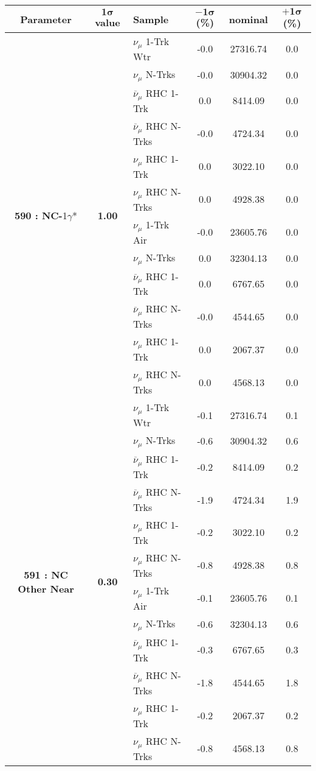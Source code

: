 \begin{table}[ht!]
\centering

\begin{tabular}{ c  c  l  c  c  c }
\midrule[1.3pt]
\textbf{Parameter} & \textbf{$\mathbf{1\sigma}$ value} & \textbf{Sample} & \textbf{$\mathbf{-1\sigma}$ (\%)}  &  \textbf{nominal}  &  \textbf{$\mathbf{+1\sigma}$ (\%)} \\
\midrule[1.3pt]
\multirow{12}{*}{\textbf{590 : NC-}1$\gamma$*}& \multirow{12}{*}{\textbf{1.00}} & $\nu_\mu$ 1-Trk Wtr &   -0.0 &  27316.74 &   0.0 \\ 
 &  & $\nu_\mu$ N-Trks &   -0.0 &  30904.32 &   0.0 \\ 
 &  & $\overline{\nu}_\mu$ RHC 1-Trk &   0.0 &  8414.09 &   0.0 \\ 
 &  & $\overline{\nu}_\mu$ RHC N-Trks &   -0.0 &  4724.34 &   0.0 \\ 
 &  & $\nu_\mu$ RHC 1-Trk &   0.0 &  3022.10 &   0.0 \\ 
 &  & $\nu_\mu$ RHC N-Trks &   0.0 &  4928.38 &   0.0 \\ 
 &  & $\nu_\mu$ 1-Trk Air &   -0.0 &  23605.76 &   0.0 \\ 
 &  & $\nu_\mu$ N-Trks &   0.0 &  32304.13 &   0.0 \\ 
 &  & $\overline{\nu}_\mu$ RHC 1-Trk &   0.0 &  6767.65 &   0.0 \\ 
 &  & $\overline{\nu}_\mu$ RHC N-Trks &   -0.0 &  4544.65 &   0.0 \\ 
 &  & $\nu_\mu$ RHC 1-Trk &   0.0 &  2067.37 &   0.0 \\ 
 &  & $\nu_\mu$ RHC N-Trks &   0.0 &  4568.13 &   0.0 \\ 
\midrule[1.3pt]
\multirow{12}{*}{\textbf{591 : NC Other Near}} & \multirow{12}{*}{\textbf{0.30}} & $\nu_\mu$ 1-Trk Wtr &   -0.1 &  27316.74 &   0.1 \\ 
 &  & $\nu_\mu$ N-Trks &   -0.6 &  30904.32 &   0.6 \\ 
 &  & $\overline{\nu}_\mu$ RHC 1-Trk &   -0.2 &  8414.09 &   0.2 \\ 
 &  & $\overline{\nu}_\mu$ RHC N-Trks &   -1.9 &  4724.34 &   1.9 \\ 
 &  & $\nu_\mu$ RHC 1-Trk &   -0.2 &  3022.10 &   0.2 \\ 
 &  & $\nu_\mu$ RHC N-Trks &   -0.8 &  4928.38 &   0.8 \\ 
 &  & $\nu_\mu$ 1-Trk Air &   -0.1 &  23605.76 &   0.1 \\ 
 &  & $\nu_\mu$ N-Trks &   -0.6 &  32304.13 &   0.6 \\ 
 &  & $\overline{\nu}_\mu$ RHC 1-Trk &   -0.3 &  6767.65 &   0.3 \\ 
 &  & $\overline{\nu}_\mu$ RHC N-Trks &   -1.8 &  4544.65 &   1.8 \\ 
 &  & $\nu_\mu$ RHC 1-Trk &   -0.2 &  2067.37 &   0.2 \\ 
 &  & $\nu_\mu$ RHC N-Trks &   -0.8 &  4568.13 &   0.8 \\ 
\midrule[1.3pt]
\end{tabular}
\end{table}
\addtocounter{table}{-1}

